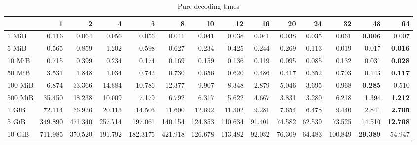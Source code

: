 \begin{centering}
\begin{table}[!h]
	\caption{Pure decoding times}
	\begin{tabular}{lrrrrrrrrrrrrr}
		\toprule
		\diagbox[width=7em]{Sizes}{Threads} & 1  &      2  &      4  &      6  &      8  &      10 &      12 &     16 &     20 &     24 &      32 &     48 &     64 \\
		\midrule
		1 MiB   &   0.116 &   0.064 &   0.056 &   0.056 &   0.041 &   0.041 &   0.038 &  0.041 &  0.038 &  0.035 &   0.061 &  \textbf{0.006} &  0.007 \\
		5 MiB   &   0.565 &   0.859 &   1.202 &   0.598 &   0.627 &   0.234 &   0.425 &  0.244 &  0.269 &  0.113 &   0.019 &  0.017 &  \textbf{0.016} \\
		10 MiB  &   0.715 &   0.399 &   0.234 &   0.174 &   0.169 &   0.159 &   0.136 &  0.119 &  0.095 &  0.085 &   0.132 &  0.031 &  \textbf{0.028} \\
		50 MiB  &   3.531 &   1.848 &   1.034 &   0.742 &   0.730 &   0.656 &   0.620 &  0.486 &  0.417 &  0.352 &   0.703 &  0.143 &  \textbf{0.117} \\
		100 MiB &   6.874 &  33.366 &  14.884 &  10.786 &  12.377 &   9.907 &   8.348 &  2.879 &  5.046 &  3.695 &   0.968 &  \textbf{0.285} &  0.510 \\
		500 MiB &  35.450 &  18.238 &  10.009 &   7.179 &   6.792 &   6.317 &   5.622 &  4.667 &  3.831 &  3.280 &   6.218 &  1.394 &  \textbf{1.212} \\
		1 GiB   &  72.114 &  36.926 &  20.113 &  14.503 &  11.600 &  12.692 &  11.302 &  9.281 &  7.654 &  6.478 &   9.440 &  2.841 &  \textbf{2.705} \\
		5 GiB   & 349.890 & 471.340 & 257.714 & 197.061 & 140.154 & 124.853 & 110.634 & 91.401 & 74.582 & 62.539 &  73.525 & 14.510 & \textbf{12.708} \\
		10 GiB  & 711.985 & 370.520 & 191.792 & 182.3175 & 421.918 & 126.678 & 113.482 & 92.082 & 76.309 & 64.483 & 100.849 & \textbf{29.389} & 54.947 \\
		\bottomrule
	\end{tabular}
\end{table}


\end{centering}
